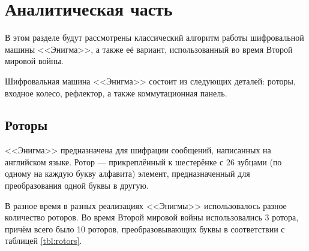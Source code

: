 \chapter{Аналитическая часть}
В этом разделе будут рассмотрены классический алгоритм работы шифровальной машины <<Энигма>>, а также её вариант, использованный во время Второй мировой войны.

Шифровальная машина <<Энигма>> состоит из следующих деталей: роторы, входное колесо, рефлектор, а также коммутационная панель.

\section{Роторы}

<<Энигма>> предназначена для шифрации сообщений, написанных на английском языке.
Ротор --- прикреплённый к шестерёнке с 26 зубцами (по одному на каждую букву алфавита) элемент, предназначенный для преобразования одной буквы в другую.

В разное время в разных реализациях <<Энигмы>> использовалось разное количество роторов. Во время Второй мировой войны использовались 3 ротора, причём всего было 10 роторов, преобразовывающих буквы в соответствии с таблицей \ref{tbl:rotors}.


